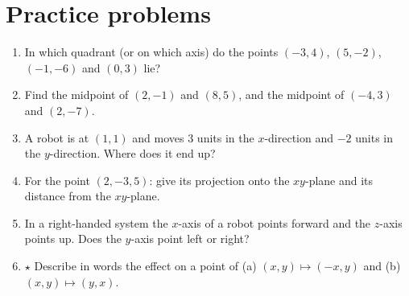 \section*{Practice problems}
\begin{enumerate}[label=\textbf{\thechapter.\arabic*}]
  \item In which quadrant (or on which axis) do the points $(-3,4)$, $(5,-2)$, $(-1,-6)$ and $(0,3)$ lie?
  \item Find the midpoint of $(2,-1)$ and $(8,5)$, and the midpoint of $(-4,3)$ and $(2,-7)$.
  \item A robot is at $(1,1)$ and moves $3$ units in the $x$-direction and $-2$ units in the $y$-direction. Where does it end up?
  \item For the point $(2,-3,5)$: give its projection onto the $xy$-plane and its distance from the $xy$-plane.
  \item In a right-handed system the $x$-axis of a robot points forward and the $z$-axis points up. Does the $y$-axis point left or right?
  \item $\star$ Describe in words the effect on a point of (a) $(x,y)\mapsto(-x,y)$ and (b) $(x,y)\mapsto(y,x)$.
\end{enumerate}

